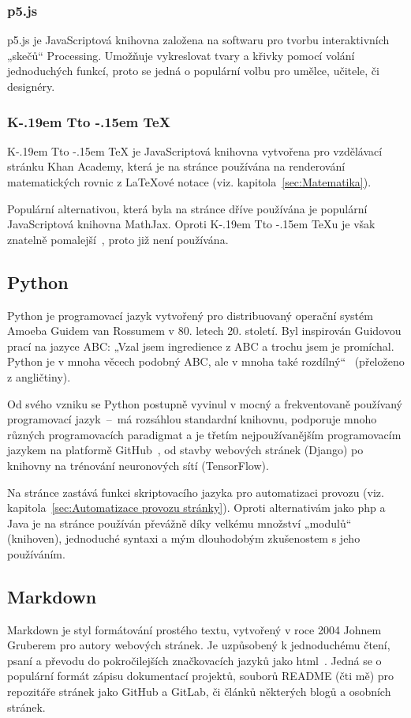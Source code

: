\documentclass[a4paper, 12pt]{article}
\makeatletter
\DeclareRobustCommand{\KaTeX}{%
  K\kern -.19em
  {\sbox \z@ T\vbox to\ht \z@ {\hbox{%
  \check@mathfonts
  \fontsize\sf@size\z@
  \selectfont A}%
  \vss}%
}\kern -.15em
\TeX}
\makeatother
\begin{document}
  \subsubsection{p5.js} \label{sec:p5.js}
  p5.js je JavaScriptová knihovna založena na softwaru pro tvorbu interaktivních „skečů“ Processing. Umožňuje vykreslovat tvary a křivky pomocí volání jednoduchých funkcí, proto se jedná o populární volbu pro umělce, učitele, či designéry.


  \subsubsection{\texorpdfstring{\KaTeX}{KaTeX}} \label{sec:KaTeX}
  \KaTeX{} je JavaScriptová knihovna vytvořena pro vzdělávací stránku Khan Academy, která je na stránce používána na renderování matematických rovnic z \LaTeX ové notace (viz. kapitola~\ref{sec:Matematika}).

  Populární alternativou, která byla na stránce dříve používána je populární JavaScriptová knihovna MathJax. Oproti \KaTeX u je však znatelně pomalejší~\cite{katex-mathjax-comparison}, proto již není používána.


  \subsection{Python} \label{sec:Python}
  Python je programovací jazyk vytvořený pro distribuovaný operační systém Amoeba Guidem van Rossumem v 80. letech 20. století. Byl inspirován Guidovou prací na jazyce ABC: „Vzal jsem ingredience z ABC a trochu jsem je promíchal. Python je v mnoha věcech podobný ABC, ale v mnoha také rozdílný“~\cite{making-of-python} (přeloženo z angličtiny).

  Od svého vzniku se Python postupně vyvinul v mocný a frekventovaně používaný programovací jazyk~--~má rozsáhlou standardní knihovnu, podporuje mnoho různých programovacích paradigmat a je třetím nejpoužívanějším programovacím jazykem na platformě GitHub~\cite{github-statistics}, od stavby webových stránek (Django) po knihovny na trénování neuronových sítí (TensorFlow).

  Na stránce zastává funkci skriptovacího jazyka pro automatizaci provozu (viz. kapitola~\ref{sec:Automatizace provozu stránky}). Oproti alternativám jako \gls{php} a Java je na stránce používán převážně díky velkému množství „modulů“ (knihoven), jednoduché syntaxi a mým dlouhodobým zkušenostem s jeho používáním.


  \subsection{Markdown} \label{sec:Markdown}
  Markdown je styl formátování prostého textu, vytvořený v roce 2004 Johnem Gruberem pro autory webových stránek. Je uzpůsobený k jednoduchému čtení, psaní a převodu do pokročilejších značkovacích jazyků jako \gls{html}~\cite{markdown-history}. Jedná se o populární formát zápisu dokumentací projektů, souborů README (čti mě) pro repozitáře stránek jako GitHub a GitLab, či článků některých blogů a osobních stránek.
\end{document}
